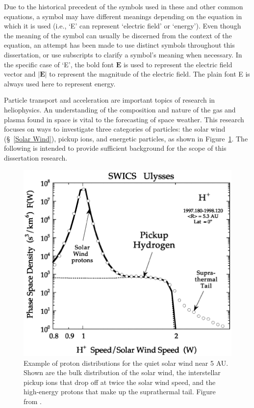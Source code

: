 Due to the historical precedent of the symbols used in these and other common equations, a symbol may have different meanings depending on the equation in which it is used (i.e., `E' can represent `electric field' or `energy'). Even though the meaning of the symbol can usually be discerned from the context of the equation, an attempt has been made to use distinct symbols throughout this dissertation, or use subscripts to clarify a symbol's meaning when necessary. In the specific case of `E', the bold font $\mathbf{E}$ is used to represent the electric field vector and $\left|\mathbf{E}\right|$  to represent the magnitude of the electric field. The plain font E is always used here to represent energy.

Particle transport and acceleration are important topics of research in heliophysics. An understanding of the composition and nature of the gas and plasma found in space is vital to the forecasting of space weather. This research focuses on ways to investigate three categories of particles: the solar wind (\S~\ref{Solar Wind}), pickup ions, and energetic particles, as shown in Figure~\ref{fig:H_Distribution}. The following is intended to provide sufficient background for the scope of this dissertation research.
\begin{figure}
  \centering
  \includegraphics[width=.65\textwidth]{format/H_Distribution}
  \caption[Example of proton distributions for the quiet solar wind near 5 AU.]{Example of proton distributions for the quiet solar wind near 5 AU. Shown are the bulk distribution of the solar wind, the interstellar pickup ions that drop off at twice the solar wind speed, and the high-energy protons that make up the suprathermal tail. Figure from \citet{gloeckler01b}.}
  \label{fig:H_Distribution}
\end{figure}

